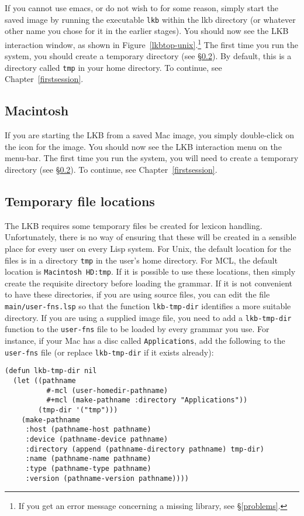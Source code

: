 \documentclass[12pt]{report}
\begin{document}
If you cannot use emacs, or do not wish to for some reason,
simply start the saved image by running the executable
{\tt lkb} within the lkb directory (or whatever
other name you chose for it in the earlier stages).
You
should now see the LKB interaction window, as shown in 
Figure~\ref{lkbtop-unix}.\footnote{If 
you get an error message concerning a missing library,
see \S\ref{problems}.}
The first time you run the system, you should
create a temporary directory (see \S\ref{tempdir}).  By default, this is
a directory called {\tt tmp} in your home directory.
To continue, see Chapter~\ref{firstsession}.

\subsection{Macintosh}
\label{mcl-image}

If you are starting the LKB from a saved
Mac image, you simply double-click on the
icon for the image. 
You
should now see the LKB interaction menu on the menu-bar. 
The first time you run the system, you will need to
create a temporary directory (see \S\ref{tempdir}).
To continue, see Chapter~\ref{firstsession}.


\subsection{Temporary file locations}
\label{tempdir}

The LKB requires some temporary files be created for lexicon handling.  
Unfortunately, there is no way of ensuring that these will be created 
in a sensible place for every user on every Lisp system.
For
Unix, the default location for the
files is in a directory {\tt tmp} in the user's
home directory.  For MCL, the default location is {\tt Macintosh HD:tmp}.  If
it is possible to use these locations, then simply create the requisite
directory before loading the grammar.  If it is not convenient to have these
directories, if you are using source files, you can edit the file {\tt
main/user-fns.lsp} so that the function {\tt lkb-tmp-dir} identifies a more
suitable directory.  If you are using a supplied image file, you need to add a
{\tt lkb-tmp-dir} 
function to the {\tt user-fns} file to be loaded by every grammar 
you use.  For instance,
if your Mac has a disc called {\tt Applications}, add the following
to the {\tt user-fns} file (or replace {\tt lkb-tmp-dir} if it exists
already):
\begin{verbatim}
(defun lkb-tmp-dir nil 
  (let ((pathname  
          #-mcl (user-homedir-pathname)
          #+mcl (make-pathname :directory "Applications"))
        (tmp-dir '("tmp")))
    (make-pathname
     :host (pathname-host pathname) 
     :device (pathname-device pathname)
     :directory (append (pathname-directory pathname) tmp-dir)
     :name (pathname-name pathname) 
     :type (pathname-type pathname)
     :version (pathname-version pathname))))
\end{verbatim}
\end{document}
